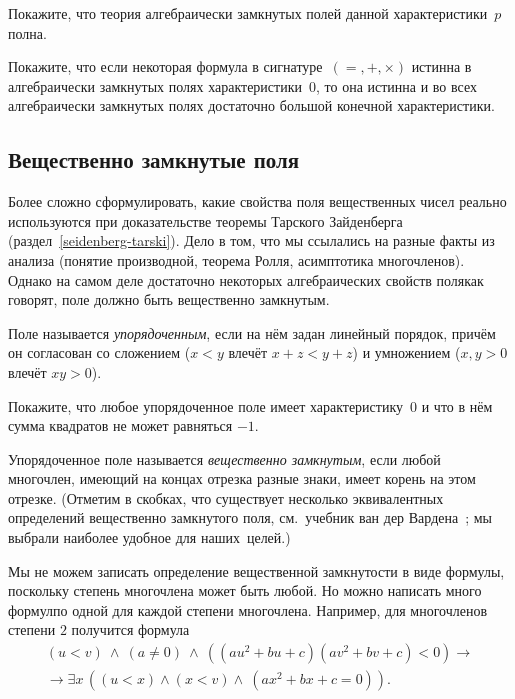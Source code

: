 \begin{problem}
Покажите, что теория алгебраически замкнутых полей данной
характеристики~$p$ полна.
\end{problem}

\begin{problem}
Покажите, что если некоторая формула в сигнатуре~$({=},{+},{\times})$
истинна в алгебраически замкнутых полях
характеристики~$0$, то она истинна и во всех алгебраически
замкнутых полях достаточно большой конечной характеристики.
\end{problem}

\subsection*{Вещественно замкнутые поля}
        \label{real-closed-fields}%

Более сложно сформулировать, какие свойства поля вещественных чисел
реально используются при доказательстве теоремы Тарского\ч
Зайденберга (раздел~\ref{seidenberg-tarski}). Дело в том, что мы
ссылались на разные факты из анализа (понятие производной,
теорема Ролля, асимптотика многочленов). Однако на самом деле
достаточно некоторых алгебраических свойств поля\т как говорят,
поле должно быть  вещественно замкнутым.

Поле называется \emph{упорядоченным},%
%
если на нём задан линейный
порядок, причём он согласован со сложением ($x<y$ влечёт
$x+z<y+z$) и умножением ($x,y>0$ влечёт $xy>0$).

\begin{problem}
Покажите, что любое упорядоченное поле имеет характеристику~$0$
и что в нём сумма квадратов не может
равняться $-1$.
\end{problem}

Упорядоченное поле называется \emph{вещественно замкнутым},%
%
если любой многочлен, имеющий на концах отрезка разные знаки, имеет
корень на этом отрезке. (Отметим в скобках, что существует
несколько эквивалентных определений вещественно замкнутого поля,
см.~учебник ван дер Вардена~\cite{vanderwaerden};
мы выбрали наиболее удобное для наших~целей.)

Мы не можем записать определение вещественной замкнутости в виде
формулы, поскольку степень многочлена может быть любой. Но можно
написать много формул\т по одной для каждой степени многочлена.
Например, для многочленов степени $2$ получится формула
\begin{multline*}
(u<v)\ \land\ (a\ne 0)\  \land\ ((au^2+bu+c)(av^2+bv+c)<0) \to\\
\to\exists x\, ((u<x)\land (x<v)\land\ (ax^2+bx+c=0)).
\end{multline*}

